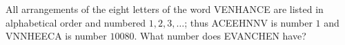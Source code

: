 All arrangements of the eight letters of the word VENHANCE are listed in alphabetical order and numbered $1,2,3,\ldots$; thus ACEEHNNV is number $1$ and VNNHEECA is number $10080$. What number does EVANCHEN have?
